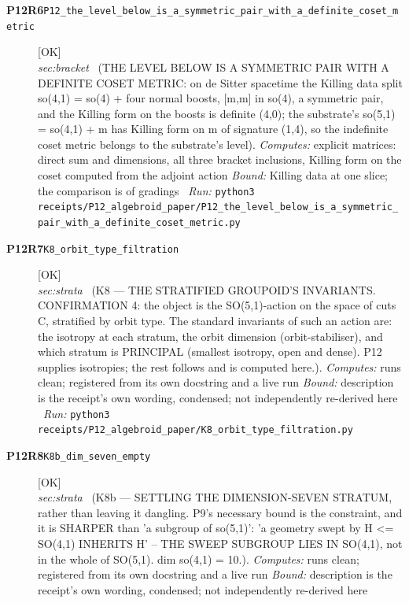 \begin{description}
\item[\textbf{P12R6}\quad\texttt{P12\_the\_level\_below\_is\_a\_symmetric\_pair\_with\_a\_definite\_coset\_metric}]\hfill\textsf{[OK]}\\
\textit{sec:bracket} \ (THE LEVEL BELOW IS A SYMMETRIC PAIR WITH A DEFINITE COSET METRIC: on de Sitter spacetime the Killing data split so(4,1) = so(4) + four normal boosts, [m,m] in so(4), a symmetric pair, and the Killing form on the boosts is definite (4,0); the substrate's so(5,1) = so(4,1) + m has Killing form on m of signature (1,4), so the indefinite coset metric belongs to the substrate's level). 
\emph{Computes:} explicit matrices: direct sum and dimensions, all three bracket inclusions, Killing form on the coset computed from the adjoint action
 \emph{Bound:} Killing data at one slice; the comparison is of gradings
\ \emph{Run:} \texttt{python3 receipts/P12\_algebroid\_paper/P12\_the\_level\_below\_is\_a\_symmetric\_pair\_with\_a\_definite\_coset\_metric.py}
\item[\textbf{P12R7}\quad\texttt{K8\_orbit\_type\_filtration}]\hfill\textsf{[OK]}\\
\textit{sec:strata} \ (K8 --- THE STRATIFIED GROUPOID'S INVARIANTS. CONFIRMATION 4: the object is the SO(5,1)-action on the space of cuts C, stratified by orbit type. The standard invariants of such an action are: the isotropy at each stratum, the orbit dimension (orbit-stabiliser), and which stratum is PRINCIPAL (smallest isotropy, open and dense). P12 supplies isotropies; the rest follows and is computed here.). 
\emph{Computes:} runs clean; registered from its own docstring and a live run
 \emph{Bound:} description is the receipt's own wording, condensed; not independently re-derived here
\ \emph{Run:} \texttt{python3 receipts/P12\_algebroid\_paper/K8\_orbit\_type\_filtration.py}
\item[\textbf{P12R8}\quad\texttt{K8b\_dim\_seven\_empty}]\hfill\textsf{[OK]}\\
\textit{sec:strata} \ (K8b --- SETTLING THE DIMENSION-SEVEN STRATUM, rather than leaving it dangling. P9's necessary bound is the constraint, and it is SHARPER than 'a subgroup of so(5,1)': 'a geometry swept by H <= SO(4,1) INHERITS H' -- THE SWEEP SUBGROUP LIES IN SO(4,1), not in the whole of SO(5,1). dim so(4,1) = 10.). 
\emph{Computes:} runs clean; registered from its own docstring and a live run
 \emph{Bound:} description is the receipt's own wording, condensed; not independently re-derived here

\end{description}
